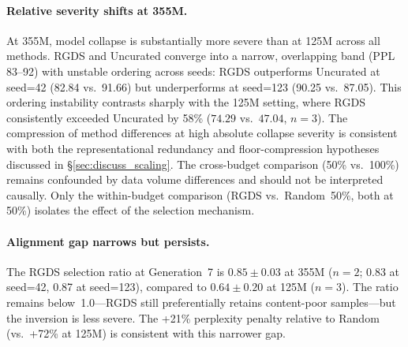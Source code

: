 \paragraph{Relative severity shifts at 355M.} At 355M, model collapse is substantially more severe than at 125M across all methods. RGDS and Uncurated converge into a narrow, overlapping band (PPL 83--92) with unstable ordering across seeds: RGDS outperforms Uncurated at seed=42 (82.84 vs.\ 91.66) but underperforms at seed=123 (90.25 vs.\ 87.05). This ordering instability contrasts sharply with the 125M setting, where RGDS consistently exceeded Uncurated by 58\% ($74.29$ vs.\ $47.04$, $n{=}3$). The compression of method differences at high absolute collapse severity is consistent with both the representational redundancy and floor-compression hypotheses discussed in \S\ref{sec:discuss_scaling}. The cross-budget comparison (50\% vs.\ 100\%) remains confounded by data volume differences and should not be interpreted causally. Only the within-budget comparison (RGDS vs.\ Random~50\%, both at 50\%) isolates the effect of the selection mechanism.%

\paragraph{Alignment gap narrows but persists.} The RGDS selection ratio at Generation~7 is $0.85 \pm 0.03$ at 355M ($n{=}2$; 0.83 at seed=42, 0.87 at seed=123), compared to $0.64 \pm 0.20$ at 125M ($n{=}3$). The ratio remains below~1.0---RGDS still preferentially retains content-poor samples---but the inversion is less severe. The +21\% perplexity penalty relative to Random (vs.\ +72\% at 125M) is consistent with this narrower gap.%
